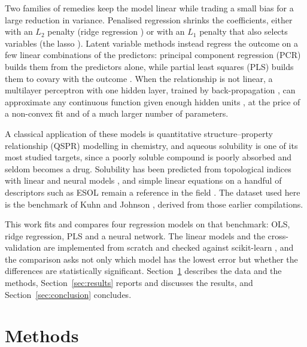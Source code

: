\documentclass[conference]{IEEEtran}
\begin{document}
Two families of remedies keep the model linear while trading a small
bias for a large reduction in variance. Penalised regression shrinks
the coefficients, either with an $L_2$ penalty (ridge regression
\cite{hoerl1970}) or with an $L_1$ penalty that also selects variables
(the lasso \cite{tibshirani1996}). Latent variable methods instead
regress the outcome on a few linear combinations of the predictors:
principal component regression (PCR) builds them from the predictors
alone, while partial least squares (PLS) builds them to covary with the
outcome \cite{wold2001}. When the relationship is not linear, a
multilayer perceptron with one hidden layer, trained by
back-propagation \cite{rumelhart1986}, can approximate any continuous
function given enough hidden units \cite{hornik1989}, at the price of a
non-convex fit and of a much larger number of parameters.

A classical application of these models is quantitative
structure--property relationship (QSPR) modelling in chemistry, and
aqueous solubility is one of its most studied targets, since a poorly
soluble compound is poorly absorbed and seldom becomes a drug.
Solubility has been predicted from topological indices with linear and
neural models \cite{huuskonen2000,tetko2001}, and simple linear
equations on a handful of descriptors such as ESOL remain a reference
in the field \cite{delaney2004}. The dataset used here is the
benchmark of Kuhn and Johnson \cite{kuhn2013}, derived from those
earlier compilations.

This work fits and compares four regression models on that benchmark:
OLS, ridge regression, PLS and a neural network. The linear models and
the cross-validation are implemented from scratch and checked against
scikit-learn \cite{pedregosa2011}, and the comparison asks not only
which model has the lowest error but whether the differences are
statistically significant. Section~\ref{sec:methods} describes the data
and the methods, Section~\ref{sec:results} reports and discusses the
results, and Section~\ref{sec:conclusion} concludes.

\section{Methods}
\label{sec:methods}
\end{document}
